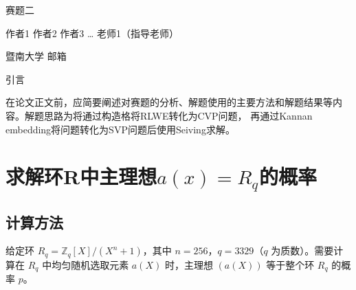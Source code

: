 \documentclass[12pt,a4paper]{article}
\newcommand{\fs}{\CJKfamily{fs}}
\numberwithin{equation}{section}
\begin{document}
\begin{center}
	{\heiti\fontsize{16pt}{24pt}\selectfont 赛题二}
\end{center}

\begin{center}
	{\fs\fontsize{12pt}{18pt}\selectfont 作者1 作者2 作者3 … 老师1（指导老师）}
\end{center}

\begin{center}
	{\songti\fontsize{10.5pt}{15.75pt}\selectfont 暨南大学 \; 邮箱}
\end{center}

\vspace{1em}


\vspace{1em}


\vspace{2em}

{\centering\heiti\fontsize{16pt}{24pt}\selectfont 引言\par}
\vspace{1em}

在论文正文前，应简要阐述对赛题的分析、解题使用的主要方法和解题结果等内容。解题思路为将通过构造格将RLWE转化为CVP问题，
再通过Kannan embedding将问题转化为SVP问题后使用Seiving求解。

\section[求解环R中主理想a(x)=Rq的概率]{求解环R中主理想$a(x)=R_q$的概率}

\subsection{计算方法}

给定环 $R_q = \mathbb{Z}_q[X]/(X^n + 1)$，其中 $n = 256$，$q = 3329$（$q$ 为质数）。需要计算在 $R_q$ 中均匀随机选取元素 $a(X)$ 时，主理想 $(a(X))$ 等于整个环 $R_q$ 的概率 $p$。
\end{document}
